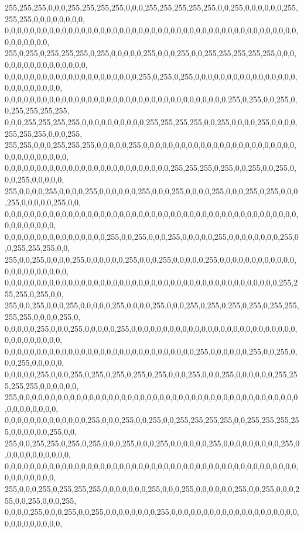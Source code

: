 \begin{DoxyCode}
      255,255,255,0,0,0,255,255,255,255,0,0,0,255,255,255,255,255,0,0,255,0,0,0,0,0,0,255,255,255,0,0,0,0,0,0,0,0,
      0,0,0,0,0,0,0,0,0,0,0,0,0,0,0,0,0,0,0,0,0,0,0,0,0,0,0,0,0,0,0,0,0,0,0,0,0,0,0,0,0,0,0,0,0,0,0,0,0,0,0,0,0,
      255,0,255,0,255,255,255,0,255,0,0,0,0,0,255,0,0,0,255,0,0,255,255,255,255,255,0,0,0,0,0,0,0,0,0,0,0,0,0,0,0,0,
      0,0,0,0,0,0,0,0,0,0,0,0,0,0,0,0,0,0,0,0,0,255,0,255,0,255,0,0,0,0,0,0,0,0,0,0,0,0,0,0,0,0,0,0,0,0,0,0,0,0,0,
      0,0,0,0,0,0,0,0,0,0,0,0,0,0,0,0,0,0,0,0,0,0,0,0,0,0,0,0,0,0,0,0,0,0,0,255,0,255,0,0,255,0,0,255,255,255,255,
      0,0,0,255,255,255,255,0,0,0,0,0,0,0,0,0,0,255,255,255,255,0,0,255,0,0,0,0,255,0,0,0,0,255,255,255,0,0,0,255,
      255,255,0,0,0,255,255,255,0,0,0,0,0,255,0,0,0,0,0,0,0,0,0,0,0,0,0,0,0,0,0,0,0,0,0,0,0,0,0,0,0,0,0,0,0,0,0,0,
      0,0,0,0,0,0,0,0,0,0,0,0,0,0,0,0,0,0,0,0,0,0,0,0,0,0,255,255,255,0,255,0,0,255,0,0,255,0,0,0,255,0,0,0,0,0,
      255,0,0,0,0,255,0,0,0,0,255,0,0,0,0,0,0,255,0,0,0,255,0,0,0,0,255,0,0,0,255,0,255,0,0,0,255,0,0,0,0,0,255,0,0,
      0,0,0,0,0,0,0,0,0,0,0,0,0,0,0,0,0,0,0,0,0,0,0,0,0,0,0,0,0,0,0,0,0,0,0,0,0,0,0,0,0,0,0,0,0,0,0,0,0,0,0,0,0,0,
      0,0,0,0,0,0,0,0,0,0,0,0,0,0,0,0,255,0,0,255,0,0,0,255,0,0,0,0,0,255,0,0,0,0,0,0,0,0,255,0,0,255,255,255,0,0,
      255,0,0,255,0,0,0,0,255,0,0,0,0,0,0,255,0,0,0,255,0,0,0,0,0,255,0,0,0,0,0,0,0,0,0,0,0,0,0,0,0,0,0,0,0,0,0,0,
      0,0,0,0,0,0,0,0,0,0,0,0,0,0,0,0,0,0,0,0,0,0,0,0,0,0,0,0,0,0,0,0,0,0,0,0,0,0,0,0,0,0,0,255,255,255,0,255,0,0,
      255,0,0,255,0,0,0,255,0,0,0,0,0,255,0,0,0,0,255,0,0,0,255,0,255,0,255,0,255,0,255,255,255,255,0,0,0,0,255,0,
      0,0,0,0,0,255,0,0,0,255,0,0,0,0,0,255,0,0,0,0,0,0,0,0,0,0,0,0,0,0,0,0,0,0,0,0,0,0,0,0,0,0,0,0,0,0,0,0,0,0,0,
      0,0,0,0,0,0,0,0,0,0,0,0,0,0,0,0,0,0,0,0,0,0,0,0,0,0,0,0,0,0,255,0,0,0,0,0,0,255,0,0,255,0,0,0,255,0,0,0,0,0,
      0,0,0,0,0,255,0,0,0,255,0,255,0,255,0,255,0,255,0,0,0,255,0,0,0,255,0,0,0,0,0,0,255,255,255,255,0,0,0,0,0,0,
      255,0,0,0,0,0,0,0,0,0,0,0,0,0,0,0,0,0,0,0,0,0,0,0,0,0,0,0,0,0,0,0,0,0,0,0,0,0,0,0,0,0,0,0,0,0,0,0,0,0,0,0,0,
      0,0,0,0,0,0,0,0,0,0,0,0,0,255,0,0,0,255,0,0,255,0,0,255,255,255,255,0,0,255,255,255,255,0,0,0,0,0,0,255,0,0,
      255,0,0,255,255,0,255,0,255,0,0,0,255,0,0,0,255,0,0,0,0,0,0,255,0,0,0,0,0,0,0,0,0,255,0,0,0,0,0,0,0,0,0,0,0,
      0,0,0,0,0,0,0,0,0,0,0,0,0,0,0,0,0,0,0,0,0,0,0,0,0,0,0,0,0,0,0,0,0,0,0,0,0,0,0,0,0,0,0,0,0,0,0,0,0,0,0,0,0,0,
      255,0,0,0,255,0,255,255,255,0,0,0,0,0,0,0,255,0,0,0,255,0,0,0,0,0,0,255,0,0,255,0,0,0,255,0,0,255,0,0,0,255,
      0,0,0,0,255,0,0,0,255,0,0,255,0,0,0,0,0,0,0,0,255,0,0,0,0,0,0,0,0,0,0,0,0,0,0,0,0,0,0,0,0,0,0,0,0,0,0,0,0,0,

\end{DoxyCode}
